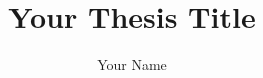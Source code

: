 \documentclass[a4paper,12pt,twoside]{report}
\begin{document}
\title{
Your Thesis Title
}

\author{Your Name}

\normallinespacing
\maketitle


\preface





\body









\clearpage
\newpage
\begin{spacing}{1.0}




\end{spacing}
\end{document}
